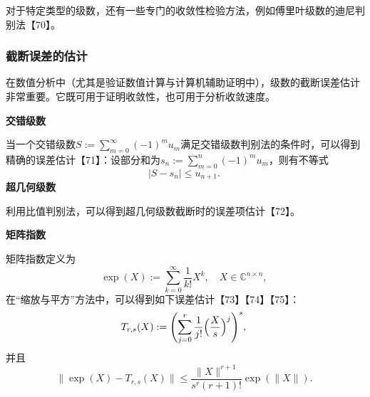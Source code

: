 对于特定类型的级数，还有一些专门的收敛性检验方法，例如傅里叶级数的迪尼判别法【70】。
\subsubsection{截断误差的估计}
在数值分析中（尤其是验证数值计算与计算机辅助证明中），级数的截断误差估计非常重要。它既可用于证明收敛性，也可用于分析收敛速度。

\textbf{交错级数}

当一个交错级数$S := \sum_{m=0}^{\infty} (-1)^{m} u_{m}$满足交错级数判别法的条件时，可以得到精确的误差估计【71】：设部分和为$s_{n} := \sum_{m=0}^{n} (-1)^{m} u_{m}$，则有不等式
$$
|S - s_{n}| \leq u_{n+1}.~
$$
\textbf{超几何级数}

利用比值判别法，可以得到超几何级数截断时的误差项估计【72】。

\textbf{矩阵指数}

矩阵指数定义为
$$
\exp(X) := \sum_{k=0}^{\infty} \frac{1}{k!} X^{k}, \quad X \in \mathbb{C}^{n \times n},~
$$
在“缩放与平方”方法中，可以得到如下误差估计【73】【74】【75】：
$$
T_{r,s}(X) := \Biggl( \sum_{j=0}^{r} \frac{1}{j!} \Bigl(\frac{X}{s}\Bigr)^{j} \Biggr)^{s},~
$$
并且
$$
\bigl\|\exp(X) - T_{r,s}(X)\bigr\| \leq \frac{\|X\|^{r+1}}{s^{r}(r+1)!} \exp(\|X\|).~
$$
